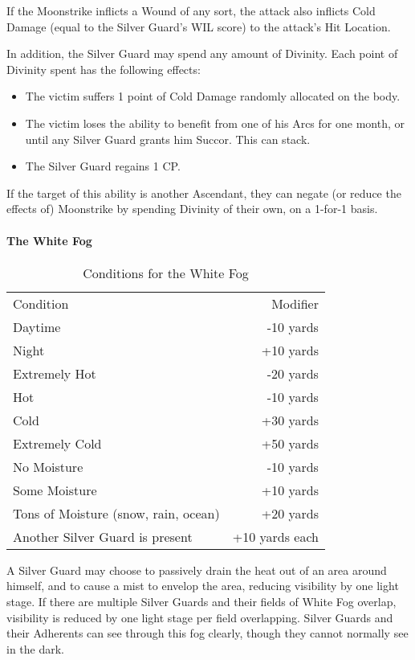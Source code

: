 \documentclass[oneside,11pt,english]{book}
\begin{document}
If the Moonstrike inflicts a Wound of any sort, the attack also inflicts Cold Damage (equal to the 
Silver Guard's WIL score) to the attack’s Hit Location. 


In addition, the Silver Guard may spend any amount of Divinity. Each point of Divinity spent has 
the following effects: 
\begin{itemize}
\item The victim suffers 1 point of Cold Damage randomly allocated on the body. 
\item The victim loses the ability to benefit from one of his Arcs for one month, or until any 
Silver Guard grants him Succor. This can stack. 
\item The Silver Guard regains 1 CP. 
\end{itemize}
If the target of this ability is another Ascendant, they can negate (or reduce the effects of) Moonstrike by spending Divinity of their own, on a 1-for-1 basis. 
\paragraph{The White Fog} %
	\setlength{\intextsep}{0pt}
\begin{wraptable}{r}{9 cm}
	\caption{Conditions for the White Fog}
	\label{tab:Dessian White Fog}
	\begin{tabu} spread 0pt {Xr}
		Condition&Modifier\\
		Daytime&-10 yards\\
		Night&+10 yards\\
		Extremely Hot&-20 yards \\
		Hot&-10 yards \\
		Cold&+30 yards \\
		Extremely Cold&+50 yards \\
		No Moisture&-10 yards \\
		Some Moisture&+10 yards \\
		Tons of Moisture (snow, rain, ocean)&+20 yards \\
		Another Silver Guard is present&+10 yards each \\
	\end{tabu}
\end{wraptable}
	\setlength{\intextsep}{\oldintextsep}
A Silver Guard may choose to passively drain the heat out of an area around himself, and to cause 
a mist to envelop the area, reducing visibility by one light stage. If there are multiple Silver 
Guards and their fields of White Fog overlap, visibility is reduced by one light stage per field 
overlapping. Silver Guards and their Adherents can see through this fog clearly, though they 
cannot normally see in the dark. 
\end{document}
